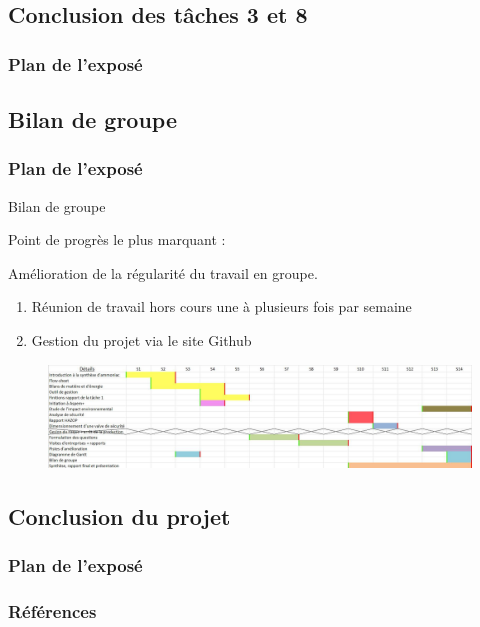 \documentclass{beamer}
\begin{document}
	\begin{frame}
		\section{Conclusion des tâches 3 et 8}
		\frametitle{Plan de l'exposé}
		\tableofcontents[currentsubsection,sectionstyle=show/shaded,subsectionstyle=show/shaded/hide]
	\end{frame}
	
	\begin{frame}
	        \section{Bilan de groupe}
		\frametitle{Plan de l'exposé}
		\tableofcontents[currentsubsection,sectionstyle=show/shaded,subsectionstyle=show/shaded/hide]
	\end{frame}
	
	\begin{frame}{Bilan de groupe}
	
		{\LARGE Point de progrès le plus marquant :}
		
		Amélioration de la régularité du travail en groupe.
		\begin{enumerate}
		\item Réunion de travail hors cours une à plusieurs fois par semaine
		\item Gestion du projet via le site Github
		\end{enumerate}
		\begin{figure}
			\centering
			\includegraphics[scale=0.17]{media/DiagrammeDeGantt.png}
		\end{figure}
	\end{frame}
	
	\begin{frame}
		\section{Conclusion du projet}
		\frametitle{Plan de l'exposé}
		\tableofcontents[currentsubsection,sectionstyle=show/shaded,subsectionstyle=show/shaded/hide]
	\end{frame}
	
	\begin{frame}[allowframebreaks]
	\frametitle{Références}
		\tiny
		
		
		\nocite{*}
	\end{frame}
	
\end{document}
